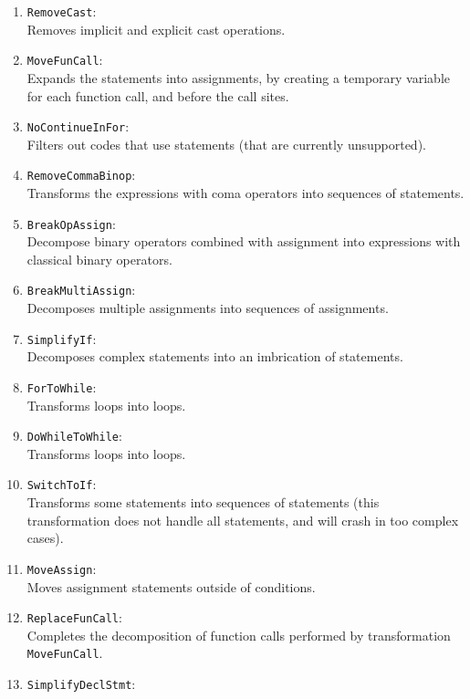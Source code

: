 \begin{enumerate}
\item \texttt{RemoveCast}: \\
  Removes implicit and explicit cast operations.
\item \texttt{MoveFunCall}: \\
  Expands the  statements into assignments, by
  creating a temporary variable for each function call, and before
  the call sites.
\item \texttt{NoContinueInFor}: \\
  Filters out codes that use  statements (that are
  currently unsupported).
\item \texttt{RemoveCommaBinop}: \\
  Transforms the expressions with coma operators into sequences of
  statements.
\item \texttt{BreakOpAssign}: \\
  Decompose binary operators combined with assignment into expressions
  with classical binary operators.
\item \texttt{BreakMultiAssign}: \\
  Decomposes multiple assignments into sequences of assignments.
\item \texttt{SimplifyIf}: \\
  Decomposes complex  statements into an imbrication of
   statements.
\item \texttt{ForToWhile}: \\
  Transforms  loops into  loops.
\item \texttt{DoWhileToWhile}: \\
  Transforms  loops into  loops.
\item \texttt{SwitchToIf}: \\
  Transforms some  statements into sequences of 
  statements
  (this transformation does not handle all  statements,
  and will crash in too complex cases).
\item \texttt{MoveAssign}: \\
  Moves assignment statements outside of conditions.
\item \texttt{ReplaceFunCall}: \\
  Completes the decomposition of function calls performed by
  transformation \texttt{MoveFunCall}.
\item \texttt{SimplifyDeclStmt}: \\

\end{enumerate}
